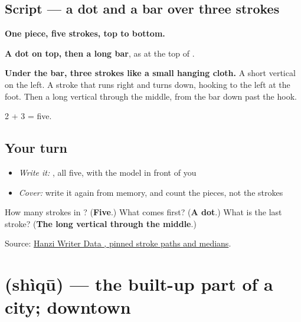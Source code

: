 \subsection*{Script — a dot and a bar over three strokes}

\begin{quote}
\end{quote}

\textbf{One piece, five strokes, top to bottom.}

\textbf{A dot on top, then a long bar}, as at the top of .

\textbf{Under the bar, three strokes like a small hanging cloth.} A short vertical on the left. A stroke that runs right and turns down, hooking to the left at the foot. Then a long vertical through the middle, from the bar down past the hook.

2 + 3 = five.

\subsection*{Your turn}
\begin{itemize}
\raggedright
  \item \emph{Write it:} , all five, with the model in front of you
  \item \emph{Cover:} write it again from memory, and count the pieces, not the strokes
\end{itemize}

\begin{tcolorbox}[breakable,colback=teal!4,colframe=teal!35!black,title={Before you move on}]
How many strokes in ? (\textbf{Five}.) What comes first? (\textbf{A dot}.) What is the last stroke? (\textbf{The long vertical through the middle}.)

Source: \href{https://raw.githubusercontent.com/chanind/hanzi-writer-data/68d10a4b21150cae5e1ebbd223eed289cf32d90c/data/\%E5\%B8\%82.json}{Hanzi Writer Data , pinned stroke paths and medians}.
\end{tcolorbox}
\section[\texorpdfstring{\zh{市区} (shìqū)}{市区 (shìqū)}]{ (shìqū) — the built-up part of a city; downtown}

\label{lesson:ZH-C448-shiqu}



